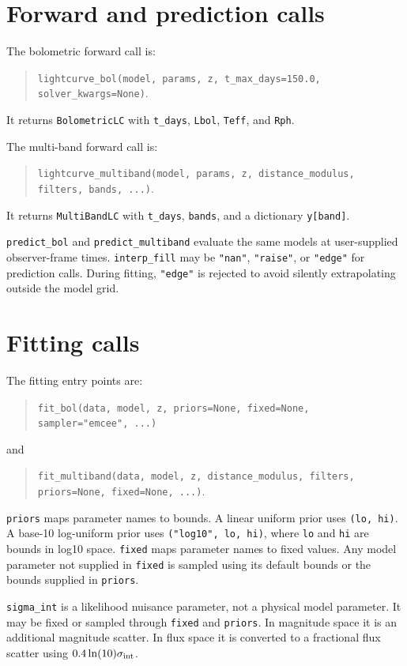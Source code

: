 \documentclass[11pt]{article}
\begin{document}
\section{Forward and prediction calls}

The bolometric forward call is:
\begin{quote}
\texttt{lightcurve\_bol(model, params, z, t\_max\_days=150.0, solver\_kwargs=None)}.
\end{quote}
It returns \texttt{BolometricLC} with \texttt{t\_days}, \texttt{Lbol},
\texttt{Teff}, and \texttt{Rph}.

The multi-band forward call is:
\begin{quote}
\texttt{lightcurve\_multiband(model, params, z, distance\_modulus, filters, bands, ...)}.
\end{quote}
It returns \texttt{MultiBandLC} with \texttt{t\_days}, \texttt{bands}, and a
dictionary \texttt{y[band]}.

\texttt{predict\_bol} and \texttt{predict\_multiband} evaluate the same models
at user-supplied observer-frame times.  \texttt{interp\_fill} may be
\texttt{"nan"}, \texttt{"raise"}, or \texttt{"edge"} for prediction calls.
During fitting, \texttt{"edge"} is rejected to avoid silently extrapolating
outside the model grid.

\section{Fitting calls}

The fitting entry points are:
\begin{quote}
\texttt{fit\_bol(data, model, z, priors=None, fixed=None, sampler="emcee", ...)}
\end{quote}
and
\begin{quote}
\texttt{fit\_multiband(data, model, z, distance\_modulus, filters, priors=None, fixed=None, ...)}.
\end{quote}

\texttt{priors} maps parameter names to bounds.  A linear uniform prior uses
\texttt{(lo, hi)}.  A base-10 log-uniform prior uses
\texttt{("log10", lo, hi)}, where \texttt{lo} and \texttt{hi} are bounds in
log10 space.  \texttt{fixed} maps parameter names to fixed values.  Any model
parameter not supplied in \texttt{fixed} is sampled using its default bounds or
the bounds supplied in \texttt{priors}.

\texttt{sigma\_int} is a likelihood nuisance parameter, not a physical model
parameter.  It may be fixed or sampled through \texttt{fixed} and
\texttt{priors}.  In magnitude space it is an additional magnitude scatter.
In flux space it is converted to a fractional flux scatter using
$0.4\ln(10)\sigma_{\rm int}$.
\end{document}
